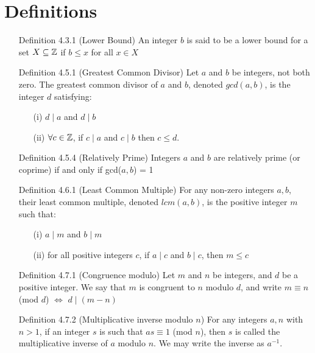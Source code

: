 \documentclass[a4paper]{article}
\begin{document}
\section{Definitions}
\begin{enumerate}
	\item[] Definition 4.3.1 (Lower Bound) An integer $b$ is said to be a lower bound for a set $X \subseteq \mathbb{Z}$ if $b \le x$ for all $x \in X$
	\item[] Definition 4.5.1 (Greatest Common Divisor) Let $a$ and $b$ be integers, not both zero. The greatest common divisor of $a$ and $b$, denoted $gcd(a,b)$, is the integer $d$ satisfying:
	\begin{enumerate}
		\item[(i)] $d\mid a$ and $d\mid b$
		\item[(ii)] $\forall c \in \mathbb{Z}$, if $c\mid a$ and $c\mid b$ then $c \le d$. 
	\end{enumerate}
	\item[] Definition 4.5.4 (Relatively Prime) Integers $a$ and $b$ are relatively prime (or coprime) if and only if gcd($a,b$) = 1
	\item[] Definition 4.6.1 (Least Common Multiple) For any non-zero integers $a,b$, their least common multiple, denoted $lcm(a,b)$, is the positive integer $m$ such that: 
	\begin{enumerate}
		\item[(i)] $a\mid m$ and $b\mid m$
		\item[(ii)] for all positive integers $c$, if $a\mid c$ and $b\mid c$, then $m\le c$
	\end{enumerate}
	\item[] Definition 4.7.1 (Congruence modulo) Let $m$ and $n$ be integers, and $d$ be a positive integer. We say that $m$ is congruent to $n$ modulo $d$, and write $m\equiv n$ (mod $d$) $\iff$ $d\mid (m-n)$
	\item[] Definition 4.7.2 (Multiplicative inverse modulo $n$) For any integers $a, n$ with $n>1$, if an integer $s$ is such that $as \equiv 1$ (mod $n$), then $s$ is called the multiplicative inverse of $a$ modulo $n$. We may write the inverse as $a^{-1}$.
	
\end{enumerate}
\end{document}
